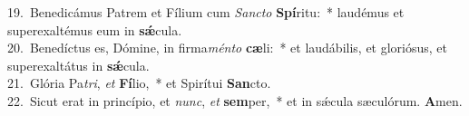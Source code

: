 {19.~}Benedicámus Patrem et Fílium cum \textit{San}\textit{cto} \textbf{Spí}ritu:~* laudémus et superexaltémus eum in \textbf{sǽ}cula.\\
{20.~}Benedíctus es, Dómine, in firma\textit{mén}\textit{to} \textbf{cæ}li:~* et laudábilis, et gloriósus, et superexaltátus in \textbf{sǽ}cula.\\
{21.~}Glória Pa\textit{tri}, \textit{et} \textbf{Fí}lio,~* et Spirítui \textbf{San}cto.\\
{22.~}Sicut erat in princípio, et \textit{nunc}, \textit{et} \textbf{sem}per,~* et in sǽcula sæculórum. \textbf{A}men.\\
